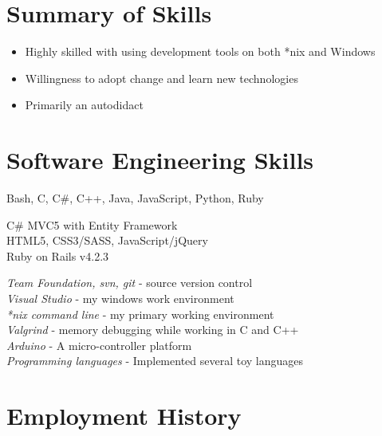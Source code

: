 \documentclass[10pt]{article} %
\begin{document}
\section{Summary of Skills}
\begin{itemize}
\item Highly skilled with using development tools on both *nix and Windows
\item Willingness to adopt change and learn new technologies
\item Primarily an autodidact
\end{itemize}

\section{Software Engineering Skills}

{
  Bash, C, C\#, C++, Java, JavaScript, Python, Ruby
}


{
  C\# MVC5 with Entity Framework \\
  HTML5, CSS3/SASS, JavaScript/jQuery \\
  Ruby on Rails v4.2.3 \\
}


{
\textit{Team Foundation, svn, git} - source version control \\
\textit{Visual Studio} - my windows work environment \\
\textit{*nix command line} - my primary working environment \\
\textit{Valgrind} - memory debugging while working in C and C++ \\
\textit{Arduino} - A micro-controller platform \\
\textit{Programming languages} - Implemented several toy languages
}


\section{Employment History}
\end{document}
